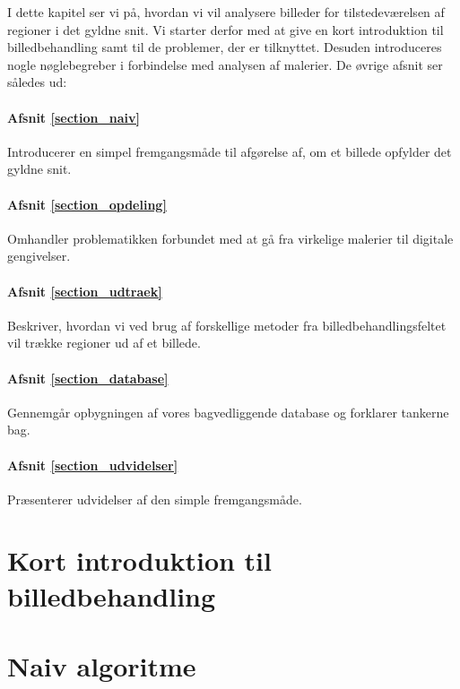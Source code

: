 {
{\sffamily I dette kapitel ser vi på, hvordan vi vil analysere billeder
for tilstedeværelsen af regioner i det gyldne snit. Vi starter derfor
med at give en kort introduktion til billedbehandling samt til de
problemer, der er tilknyttet. Desuden introduceres nogle nøglebegreber i
forbindelse med analysen af malerier. De øvrige afsnit ser således ud:

\paragraph{Afsnit \ref{section_naiv}} Introducerer en simpel
fremgangsmåde til afgørelse af, om et billede opfylder det gyldne snit.

\paragraph{Afsnit \ref{section_opdeling}} Omhandler problematikken
forbundet med at gå fra virkelige malerier til digitale gengivelser.

\paragraph{Afsnit \ref{section_udtraek}} Beskriver, hvordan vi ved brug
af forskellige metoder fra billedbehandlingsfeltet vil trække regioner ud af
et billede.

\paragraph{Afsnit \ref{section_database}} Gennemgår opbygningen af vores
bagvedliggende database og forklarer tankerne bag.

\paragraph{Afsnit \ref{section_udvidelser}} Præsenterer udvidelser af
den simple fremgangsmåde.
}

\section{Kort introduktion til billedbehandling\label{section_kort_intro}}


\section{Naiv algoritme\label{section_naiv}}


}
